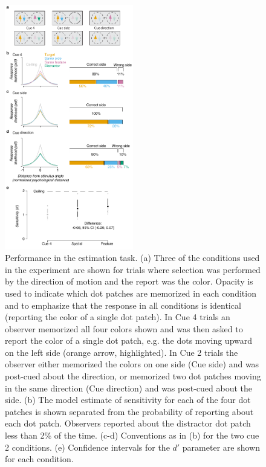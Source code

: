 \begin{figure}
\centering
\includegraphics[keepaspectratio,width=0.5\textwidth]{figs_c4/f4b_estimation_perf.pdf}
\caption[Estimation task performance]{Performance in the estimation task. (a) Three of the conditions used in the experiment are shown for trials where selection was performed by the direction of motion and the report was the color. Opacity is used to indicate which dot patches are memorized in each condition and to emphasize that the response in all conditions is identical (reporting the color of a single dot patch). In Cue 4 trials an observer memorized all four colors shown and was then asked to report the color of a single dot patch, e.g. the dots moving upward on the left side (orange arrow, highlighted). In Cue 2 trials the observer either memorized the colors on one side (Cue side) and was post-cued about the direction, or memorized two dot patches moving in the same direction (Cue direction) and was post-cued about the side. (b) The model estimate of sensitivity for each of the four dot patches is shown separated from the probability of reporting about each dot patch. Observers reported about the distractor dot patch less than 2\% of the time. (c-d) Conventions as in (b) for the two cue 2 conditions. (e) Confidence intervals for the $d'$ parameter are shown for each condition.}
\label{fig:c4f6}
\end{figure}

